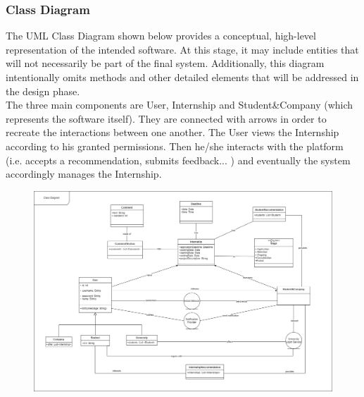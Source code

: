 \documentclass{article}
\begin{document}
\subsubsection{Class Diagram}
The UML Class Diagram shown below provides a conceptual, high-level representation of the intended software. At this stage, it may include entities that will not necessarily be part of the final system. Additionally, this diagram intentionally omits methods and other detailed elements that will be addressed in the design phase.
\\The three main components are User, Internship and Student\&Company (which represents the software itself). They are connected with arrows in order to recreate the interactions between one another. The User views the Internship according to his granted permissions. Then he/she interacts with the platform (i.e. accepts a recommendation, submits feedback... ) and eventually the system accordingly manages the Internship.
\begin{figure}[H]
    \centering
    \includegraphics[scale = 0.30]{figures/Class Diagram.drawio.png}
    \centering
\end{figure}
\end{document}
